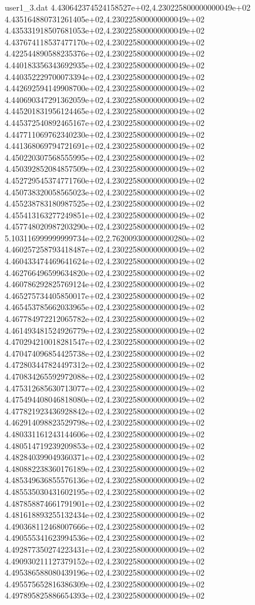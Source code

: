 \begin{filecontents}{user1_3.dat}
4.430642374524158527e+02,4.230225800000000049e+02
4.435164880731261405e+02,4.230225800000000049e+02
4.435331918507681053e+02,4.230225800000000049e+02
4.437674118537477170e+02,4.230225800000000049e+02
4.422544890588235376e+02,4.230225800000000049e+02
4.440183356343692935e+02,4.230225800000000049e+02
4.440352229700073394e+02,4.230225800000000049e+02
4.442692594149908700e+02,4.230225800000000049e+02
4.440690347291362059e+02,4.230225800000000049e+02
4.445201831956124465e+02,4.230225800000000049e+02
4.445372540892465167e+02,4.230225800000000049e+02
4.447711069762340230e+02,4.230225800000000049e+02
4.441368069794721691e+02,4.230225800000000049e+02
4.450220307568555995e+02,4.230225800000000049e+02
4.450392852084857509e+02,4.230225800000000049e+02
4.452729545374771760e+02,4.230225800000000049e+02
4.450738320058565023e+02,4.230225800000000049e+02
4.455238783180987525e+02,4.230225800000000049e+02
4.455413163277249851e+02,4.230225800000000049e+02
4.457748020987203290e+02,4.230225800000000049e+02
5.103116999999999734e+02,2.762009300000000280e+02
4.460257258793418487e+02,4.230225800000000049e+02
4.460433474469641624e+02,4.230225800000000049e+02
4.462766496599634820e+02,4.230225800000000049e+02
4.460786292825769124e+02,4.230225800000000049e+02
4.465275734405850017e+02,4.230225800000000049e+02
4.465453785662033965e+02,4.230225800000000049e+02
4.467784972212065782e+02,4.230225800000000049e+02
4.461493481524926779e+02,4.230225800000000049e+02
4.470294210018281547e+02,4.230225800000000049e+02
4.470474096854425738e+02,4.230225800000000049e+02
4.472803447824497312e+02,4.230225800000000049e+02
4.470834265592972088e+02,4.230225800000000049e+02
4.475312685630713077e+02,4.230225800000000049e+02
4.475494408046818080e+02,4.230225800000000049e+02
4.477821923436928842e+02,4.230225800000000049e+02
4.462914098823529798e+02,4.230225800000000049e+02
4.480331161243144606e+02,4.230225800000000049e+02
4.480514719239209853e+02,4.230225800000000049e+02
4.482840399049360371e+02,4.230225800000000049e+02
4.480882238360176189e+02,4.230225800000000049e+02
4.485349636855576136e+02,4.230225800000000049e+02
4.485535030431602195e+02,4.230225800000000049e+02
4.487858874661791901e+02,4.230225800000000049e+02
4.481618893255132434e+02,4.230225800000000049e+02
4.490368112468007666e+02,4.230225800000000049e+02
4.490555341623994536e+02,4.230225800000000049e+02
4.492877350274223431e+02,4.230225800000000049e+02
4.490930211127379152e+02,4.230225800000000049e+02
4.495386588080439196e+02,4.230225800000000049e+02
4.495575652816386309e+02,4.230225800000000049e+02
4.497895825886654393e+02,4.230225800000000049e+02

\end{filecontents}
